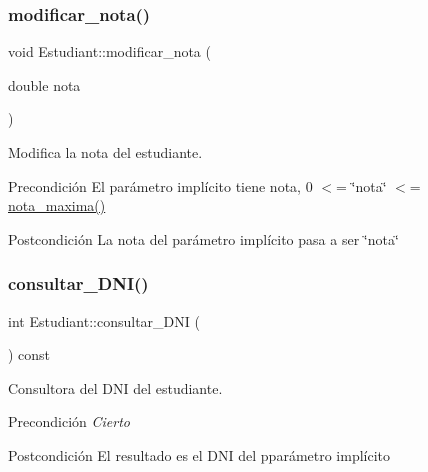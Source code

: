 \subsubsection{\texorpdfstring{modificar\+\_\+nota()}{modificar\_nota()}}
{\footnotesize\ttfamily void Estudiant\+::modificar\+\_\+nota (\begin{DoxyParamCaption}\item[{double}]{nota }\end{DoxyParamCaption})}



Modifica la nota del estudiante. 

\begin{DoxyPrecond}{Precondición}
El parámetro implícito tiene nota, 0 $<$= \char`\"{}nota\char`\"{} $<$= \hyperlink{class_estudiant_a5df5eed414c87a2a1c2efa4194633afd}{nota\+\_\+maxima()} 
\end{DoxyPrecond}
\begin{DoxyPostcond}{Postcondición}
La nota del parámetro implícito pasa a ser \char`\"{}nota\char`\"{} 
\end{DoxyPostcond}
\mbox{\label{class_estudiant_ad37108e53c6c0f1fcb5786e77e1902f5}} 
\subsubsection{\texorpdfstring{consultar\+\_\+\+D\+N\+I()}{consultar\_DNI()}}
{\footnotesize\ttfamily int Estudiant\+::consultar\+\_\+\+D\+NI (\begin{DoxyParamCaption}{ }\end{DoxyParamCaption}) const}



Consultora del D\+NI del estudiante. 

\begin{DoxyPrecond}{Precondición}
{\itshape Cierto} 
\end{DoxyPrecond}
\begin{DoxyPostcond}{Postcondición}
El resultado es el D\+NI del pparámetro implícito 
\end{DoxyPostcond}
\mbox{\label{class_estudiant_a21afbb59cddf87258d600df04ab95397}} 
